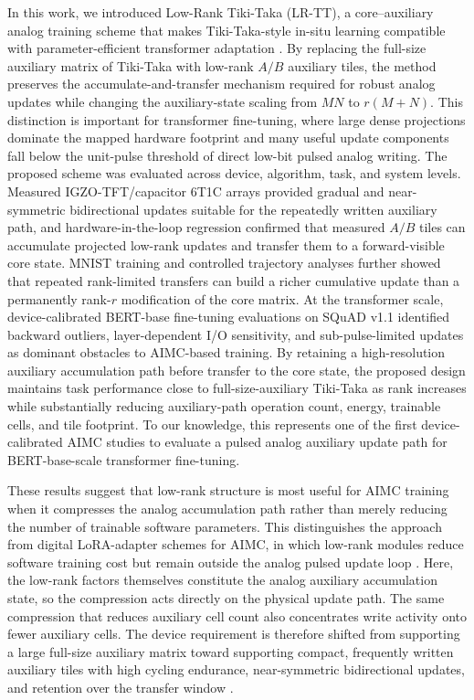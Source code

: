 \documentclass[fleqn,10pt]{wlscirep}
\begin{document}
\noindent
In this work, we introduced Low-Rank Tiki-Taka (LR-TT), a core--auxiliary analog training scheme that makes Tiki-Taka-style in-situ learning compatible with parameter-efficient transformer adaptation \cite{hu2021lora,gokmen2020tikitaka,gokmen2021ttv2}. By replacing the full-size auxiliary matrix of Tiki-Taka with low-rank \(A/B\) auxiliary tiles, the method preserves the accumulate-and-transfer mechanism required for robust analog updates while changing the auxiliary-state scaling from \(MN\) to \(r(M+N)\). This distinction is important for transformer fine-tuning, where large dense projections dominate the mapped hardware footprint and many useful update components fall below the unit-pulse threshold of direct low-bit pulsed analog writing. The proposed scheme was evaluated across device, algorithm, task, and system levels. Measured IGZO-TFT/capacitor 6T1C arrays provided gradual and near-symmetric bidirectional updates suitable for the repeatedly written auxiliary path, and hardware-in-the-loop regression confirmed that measured \(A/B\) tiles can accumulate projected low-rank updates and transfer them to a forward-visible core state. MNIST training and controlled trajectory analyses further showed that repeated rank-limited transfers can build a richer cumulative update than a permanently rank-\(r\) modification of the core matrix. At the transformer scale, device-calibrated BERT-base fine-tuning evaluations on SQuAD v1.1 identified backward outliers, layer-dependent I/O sensitivity, and sub-pulse-limited updates as dominant obstacles to AIMC-based training. By retaining a high-resolution auxiliary accumulation path before transfer to the core state, the proposed design maintains task performance close to full-size-auxiliary Tiki-Taka as rank increases while substantially reducing auxiliary-path operation count, energy, trainable cells, and tile footprint. To our knowledge, this represents one of the first device-calibrated AIMC studies to evaluate a pulsed analog auxiliary update path for BERT-base-scale transformer fine-tuning.

\noindent
These results suggest that low-rank structure is most useful for AIMC training when it compresses the analog accumulation path rather than merely reducing the number of trainable software parameters. This distinguishes the approach from digital LoRA-adapter schemes for AIMC, in which low-rank modules reduce software training cost but remain outside the analog pulsed update loop \cite{li2026ahwa_lora}. Here, the low-rank factors themselves constitute the analog auxiliary accumulation state, so the compression acts directly on the physical update path. The same compression that reduces auxiliary cell count also concentrates write activity onto fewer auxiliary cells. The device requirement is therefore shifted from supporting a large full-size auxiliary matrix toward supporting compact, frequently written auxiliary tiles with high cycling endurance, near-symmetric bidirectional updates, and retention over the transfer window \cite{rasch2024fastrobust,won2023advs_6t1c}.
\end{document}
